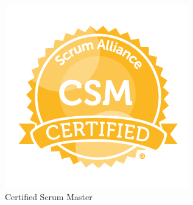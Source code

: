 \documentclass[11pt,a4paper,sans]{moderncv}
\begin{document}
{\begin{minipage}[t]{0.24\linewidth}
    \centering
    \includegraphics[width=0.9\linewidth]{../../images/Certified_Scrum_Master_(CSM)_certification_badge.PNG}\\
    \scriptsize Certified Scrum Master
  \end{minipage}
}

\end{document}
